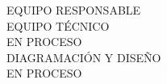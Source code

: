 {\Bold \LARGE \color{color3} EQUIPO RESPONSABLE}\\[2cm]
{\Bold \large \color{color2} EQUIPO TÉCNICO}\\[0.2cm]
EN PROCESO\\[0.8cm]
{\Bold \large \color{color2} DIAGRAMACIÓN Y DISEÑO}\\[0.2cm]
EN PROCESO\\[0.8cm]
